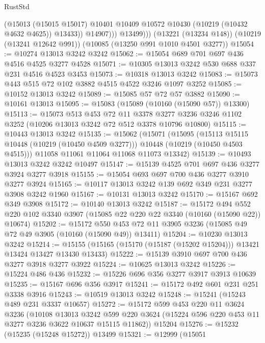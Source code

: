 \begin{lexlean}{RustStd}
\begin{coremodule}
                  (@15013
                    (@15015 @15017)
                    @10401
                    @10409
                    @10572
                    @10430
                    (@10219 (@10432 @4632 @4625))
                    @13433))
                @14907)))
          @13499)))
    (@13221 (@13234 @148))
    (@10219 (@13241 @12642 @991))
    (@10085 (@13250 @991 @1010 @4501 @3277))
@15054 := @10274 @13013 @3242 @3242
@15062 := @15054 @689 @701 @697 @436 @4516 @4525 @3277 @4528
@15071 := @10305 @13013 @3242 @530 @688 @337 @231 @4516 @4523 @3453
@15073 := @10318 @13013 @3242
@15083 := @15073 @443 @515 @72 @102 @3882 @4515 @4522 @3246 @1097 @3252
@15085 := @10152 @13013 @3242
@15089 := @15085 @57 @72 @57 @3882
@15090 := @10161 @13013
@15095 := @15083 (@15089 (@10160 (@15090 @57)) @13300)
@15113 := @15073
    @513
    @453
    @72
    @11
    @3378
    @3277
    @3236
    @3246
    @1102
    @3252
    (@10206 @13013 @3242 @72 @512 @3378 @10796 @10800)
@15115 := @10443 @13013 @3242
@15135 := @15062
    (@15071
      (@15095
        (@15113 @15115 @10448 (@10219 (@10450 @4509 @3277)))
        @10448
        (@10219 (@10450 @4503 @4515)))
      @11058
      @11061
      @11064
      @11068
      @11073
      @13342)
@15139 := @10493 @13013 @3242 @3242 @10497
@15147 := @15139 @4525 @701 @697 @436 @3277 @3924 @3277 @3918
@15155 := @15054 @693 @697 @700 @436 @3277 @3910 @3277 @3924
@15165 := @10117 @13013 @3242 @139 @692 @349 @231 @3277 @3908 @3242 @1960
@15167 := @10131 @13013 @3242
@15170 := @15167 @692 @349 @3908
@15172 := @10140 @13013 @3242
@15187 := @15172
    @494
    @552
    @220
    @102
    @3340
    @3907
    (@15085 @22 @220 @22 @3340 (@10160 (@15090 @22)) @10674)
@15202 := @15172
    @550
    @453
    @72
    @11
    @3905
    @3236
    (@15085 @49 @72 @49 @3905 (@10160 (@15090 @49)) @13411)
@15204 := @10230 @13013 @3242
@15214 := @15155 (@15165 (@15170 (@15187 (@15202 @15204))) @13421 @13424 @13427 @13430 @13433)
@15222 := @15139 @3910 @697 @700 @436 @3277 @3918 @3277 @3922
@15224 := @10625 @13013 @3242
@15226 := @15224 @486 @436
@15232 := @15226 @696 @356 @3277 @3917 @3913 @10639
@15235 := @15167 @696 @356 @3917
@15241 := @15172 @492 @601 @231 @251 @3338 @3916
@15243 := @10519 @13013 @3242
@15248 := @15241 (@15243 @489 @231 @3337 @10657)
@15272 := @15172
    @599
    @453
    @220
    @11
    @3624
    @3236
    (@10108
      @13013
      @3242
      @599
      @220
      @3624
      (@15224 @596 @220 @453 @11 @3277 @3236 @3622 @10637 @15115 @11862))
    @15204
@15276 := @15232 (@15235 (@15248 @15272)) @13499
@15321 := @12999
    (@15051

\end{coremodule}
\end{lexlean}
